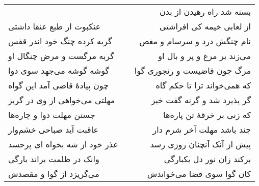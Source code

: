 \begin{center}
\begin{longtable}{l p{0.5cm} r}
&&
بسته شد راه رهیدن از بدن
\\
عنکبوت ار طبع عنقا داشتی
&&
از لعابی خیمه کی افراشتی
\\
گربه کرده چنگ خود اندر قفس
&&
نام چنگش درد و سرسام و مغص
\\
گربه مرگست و مرض چنگال او
&&
می‌زند بر مرغ و پر و بال او
\\
گوشه گوشه می‌جهد سوی دوا
&&
مرگ چون قاضیست و رنجوری گوا
\\
چون پیادهٔ قاضی آمد این گواه
&&
که همی‌خواند ترا تا حکم گاه
\\
مهلتی می‌خواهی از وی در گریز
&&
گر پذیرد شد و گرنه گفت خیز
\\
جستن مهلت دوا و چاره‌ها
&&
که زنی بر خرقهٔ تن پاره‌ها
\\
عاقبت آید صباحی خشم‌وار
&&
چند باشد مهلت آخر شرم دار
\\
عذر خود از شه بخواه ای پرحسد
&&
پیش از آنک آنچنان روزی رسد
\\
وانک در ظلمت براند بارگی
&&
برکند زان نور دل یکبارگی
\\
می‌گریزد از گوا و مقصدش
&&
کان گوا سوی قضا می‌خواندش
\\
\end{longtable}
\end{center}
